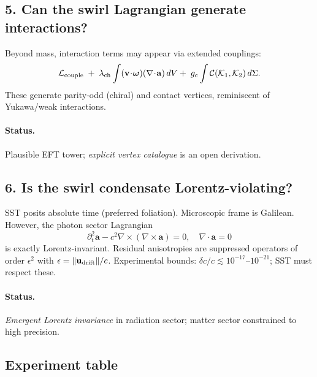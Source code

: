 \documentclass[11pt]{article}
\begin{document}
        \subsection*{5. Can the swirl Lagrangian generate interactions?}

        Beyond mass, interaction terms may appear via extended couplings:
        \[
            \mathcal L_{\rm couple}\;+\;\lambda_{\rm ch}\int (\mathbf v\!\cdot\!\boldsymbol\omega)(\nabla\!\cdot\!\mathbf a)\,dV
            +\;g_c \int \mathcal C(\mathcal K_1,\mathcal K_2)\,d\Sigma.
        \]
        These generate parity-odd (chiral) and contact vertices, reminiscent of Yukawa/weak interactions.

        \paragraph{Status.} Plausible EFT tower; \emph{explicit vertex catalogue} is an open derivation.

        \subsection*{6. Is the swirl condensate Lorentz-violating?}

        SST posits absolute time (preferred foliation). Microscopic frame is Galilean.
        However, the photon sector Lagrangian
        \[
            \partial_t^2 \mathbf a - c^2 \nabla\times(\nabla\times \mathbf a)=0,\quad \nabla\cdot\mathbf a=0
        \]
        is exactly Lorentz-invariant. Residual anisotropies are suppressed operators of order $\epsilon^2$ with $\epsilon=\|\mathbf u_{\rm drift}\|/c$.
        Experimental bounds: $\delta c/c \lesssim 10^{-17}$--$10^{-21}$; SST must respect these.

        \paragraph{Status.} \emph{Emergent Lorentz invariance} in radiation sector; matter sector constrained to high precision.

        \subsection*{Experiment table}
\end{document}
